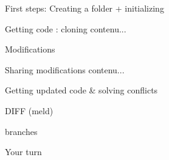 \documentclass{beamer}
\begin{document}
	\begin{frame}{First steps: Creating a folder + initializing}
		
	\end{frame}
	\begin{frame}{Getting code : cloning}
		contenu...
	\end{frame}
	\begin{frame}{Modifications}
		
	\end{frame}
	\begin{frame}{Sharing modifications}
		contenu...
	\end{frame}
	\begin{frame}{Getting updated code \& solving conflicts}
	
	\end{frame}
	\begin{frame}
		DIFF (meld)
	\end{frame}
	\begin{frame}
		branches
	\end{frame}
	\begin{frame}
		Your turn
	\end{frame}	
\end{document}

